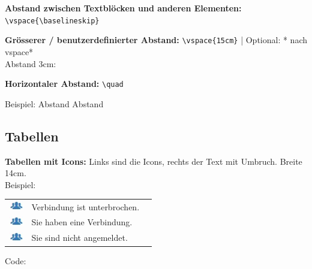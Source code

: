 \vspace{\baselineskip}

\textbf{Abstand zwischen Textblöcken und anderen Elementen:}\\
\verb+\vspace{\baselineskip}+

\vspace{\baselineskip}

\textbf{Grösserer / benutzerdefinierter Abstand:} \verb+\vspace{15cm}+ | Optional: * nach vspace*\\

Abstand 3cm:
\vspace{3cm}


\textbf{Horizontaler Abstand:} \verb+\quad+

Beispiel: \quad Abstand \quad Abstand





\subsection{Tabellen}

\textbf{Tabellen mit Icons:}
Links sind die Icons, rechts der Text mit Umbruch. Breite 14cm.\\

Beispiel:\\

\begin{tabular}{c | p{14cm} l} %
\includegraphics[height=12pt]{pictures/icons/Gruppe.jpg} & Verbindung ist unterbrochen. \\
\includegraphics[height=12pt]{pictures/icons/Gruppe.jpg} & Sie haben eine Verbindung. \\
\includegraphics[height=12pt]{pictures/icons/Gruppe.jpg} & Sie sind nicht angemeldet. \\
\end{tabular}

\vspace{\baselineskip}

Code:

